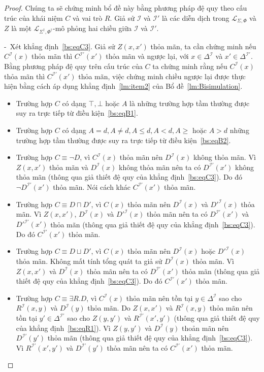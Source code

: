 \documentclass[12pt,a4paper,twoside]{report}
\newcommand{\mL}		{\mathcal{L}}
\newcommand{\mI}		{\mathcal{I}}
\newcommand{\mLSP}		{\mL_{\Sigma,\Phi}}
\newcommand{\mLSPD}		{\mL_{\Sigma^\dag,\Phi^\dag}}
\newcommand{\semiItem}	{\mbox{- }}
\newcommand{\mand}		{\sqcap}
\newcommand{\mor}		{\sqcup}
\newcommand{\E}			{\exists}
\theoremstyle{definition}
\begin{document}
\begin{proof}
Chúng ta sẽ chứng minh bổ đề này bằng phương pháp đệ quy theo cấu trúc của khái niệm $C$ và vai trò $R$.
Giả sử $\mI$ và $\mI'$ là các diễn dịch trong $\mLSP$ và $Z$ là một $\mLSPD$-mô phỏng hai chiều giữa $\mI$ và $\mI'$.

\semiItem Xét khẳng định~\eqref{bs:eqC3}. Giả sử $Z(x,x')$ thỏa mãn, ta cần chứng minh nếu $C^\mI(x)$ thỏa mãn thì $C^{\mI'}(x')$ thỏa mãn và ngược lại, với $x \in \Delta^\mI$ và $x' \in \Delta^{\mI'}$.
%
Bằng phương pháp đệ quy trên cấu trúc của $C$ ta chứng minh rằng nếu $C^\mI(x)$ thỏa mãn thì $C^{\mI'}(x')$ thỏa mãn, việc chứng minh chiều ngược lại được thực hiện bằng cách áp dụng khẳng định~\ref{lm:item2} của Bổ đề~\ref{lm:Bisimulation}.

\begin{itemize}
  \item Trường hợp $C$ có dạng $\top, \bot$ hoặc $A$ là những trường hợp tầm thường được suy ra trực tiếp từ điều kiện~\eqref{bs:eqB1}.
    
  \item Trường hợp $C$ có dạng $A = d, A\not=d, A \leq d, A < d, A \geq$ hoặc $A > d$ những trường hợp tầm thường được suy ra trực tiếp từ điều kiện~\eqref{bs:eqB2}.
  
  \item Trường hợp $C \equiv \neg D$, vì $C^\mI(x)$ thỏa mãn nên $D^\mI(x)$ không thỏa mãn. Vì $Z(x,x')$ thỏa mãn và $D^\mI(x)$ không thỏa mãn nên ta có $D^{\mI'}(x')$ không thỏa mãn (thông qua giả thiết đệ quy của khẳng định~\eqref{bs:eqC3}). Do đó $\neg D^{\mI'}(x')$ thỏa mãn. Nói cách khác $C^{\mI'}(x')$ thỏa mãn.
  
  \item Trường hợp $C \equiv D \mand D'$, vì $C(x)$ thỏa mãn nên $D^\mI(x)$ và $D'^\mI(x)$ thỏa mãn. Vì $Z(x, x')$,  $D^\mI(x)$ và $D'^\mI(x)$ thỏa mãn nên ta có $D^{\mI'}(x')$ và ${D'}^{\mI'}(x')$ thỏa mãn (thông qua giả thiết đệ quy của khẳng định~\eqref{bs:eqC3}). Do đó $C^{\mI'}(x')$ thỏa mãn.

  \item Trường hợp $C \equiv D \mor D'$, vì $C(x)$ thỏa mãn nên $D^\mI(x)$ hoặc $D'^\mI(x)$ thỏa mãn. Không mất tính tổng quát ta giả sử $D^\mI(x)$ thỏa mãn. Vì $Z(x, x')$ và $D^\mI(x)$ thỏa mãn nên ta có $D^{\mI'}(x')$ thỏa mãn (thông qua giả thiết đệ quy của khẳng định~\eqref{bs:eqC3}). Do đó $C^{\mI'}(x')$ thỏa mãn.

  \item Trường hợp $C \equiv \E R.D$, vì $C^\mI(x)$ thỏa mãn nên tồn tại $y \in \Delta^\mI$ sao cho $R^\mI(x, y)$ và $D^\mI(y)$ thỏa mãn. Do $Z(x,x')$ và $R^\mI(x, y)$ thỏa mãn nên tồn tại $y' \in \Delta^{\mI'}$ sao cho $Z(y,y')$ và $R^{\mI'}(x',y')$ (thông qua giả thiết đệ quy của khẳng định~\eqref{bs:eqR1}). Vì $Z(y,y')$ và $D^{\mI}(y)$ thoản mãn nên $D^{\mI'}(y')$ thỏa mãn (thông qua giả thiết đệ quy của khẳng định~\eqref{bs:eqC3}). Vì $R^{\mI'}(x',y')$ và $D^{\mI'}(y')$ thỏa mãn nên ta có $C^{\mI'}(x')$ thỏa mãn.
  

\end{itemize}
\end{proof}
\end{document}
